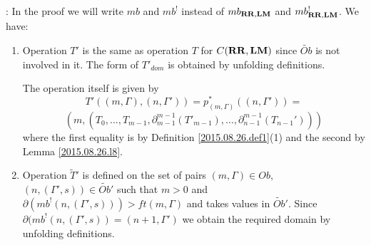\documentclass[11pt]{article}
\newenvironment{proof}{{\bf Proof}:}{\vskip 5mm }
\newcommand{\wt}{\widetilde}
\newcommand{\RR}{{\bf RR}}
\newcommand{\LM}{{\bf LM}}
\begin{document}
\begin{proof}
In the proof we will write $mb$ and $mb^!$ instead of $mb_{\RR,\LM}$ and $mb^!_{\RR,\LM}$. We have:
%
\begin{enumerate}
%
\item Operation $T'$ is the same as operation $T$ for $C(\RR,\LM)$ since $\wt{Ob}$ is not involved in it. The form of $T'_{dom}$ is obtained by unfolding definitions. 

The operation itself is given by 
%
$$T'((m,\Gamma),(n,\Gamma'))=p_{(m,\Gamma)}^*((n,\Gamma'))=$$
$$(m,(T_0,\dots,T_{m-1},\partial_{m-1}^{m-1}(T'_{m-1}),\dots, \partial_{n-1}^{m-1}(T_{n-1}')))$$
%
where the first equality is by Definition \ref{2015.08.26.def1}(1) and the second by Lemma \ref{2015.08.26.l8}. 
%
\item Operation $\wt{T}'$ is defined on the set of pairs $(m,\Gamma)\in Ob$, $(n,(\Gamma',s))\in \wt{Ob}'$ such that $m>0$ and $\partial(mb^!(n,(\Gamma',s)))>ft(m,\Gamma)$ and takes values in $\wt{Ob}'$. Since $\partial(mb^!(n,(\Gamma',s))=(n+1,\Gamma')$ we obtain the required domain by unfolding definitions. 


\end{enumerate}
\end{proof}
\end{document}
